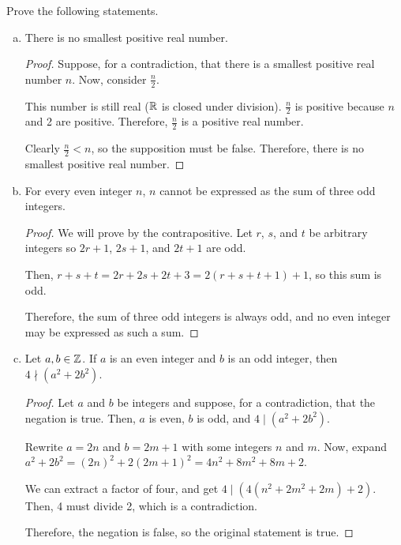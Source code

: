 \question Prove the following statements.
\begin{enumerate}[(a)]
  \item There is no smallest positive real number.
        \begin{proof}
          Suppose, for a contradiction, that there is a smallest positive real number $n$.
          Now, consider $\frac{n}{2}$.

          This number is still real ($\mathbb{R}$ is closed under division).
          $\frac{n}{2}$ is positive because $n$ and 2 are positive.
          Therefore, $\frac{n}{2}$ is a positive real number.

          Clearly $\frac{n}{2} < n$, so the supposition must be false.
          Therefore, there is no smallest positive real number.
        \end{proof}

  \item For every even integer $n$, $n$ cannot be expressed as the sum of three odd integers.
        \begin{proof}
          We will prove by the contrapositive.
          Let $r$, $s$, and $t$ be arbitrary integers so $2r+1$, $2s+1$, and $2t+1$ are odd.

          Then, $r + s + t = 2r + 2s + 2t + 3 = 2(r + s + t + 1) + 1$, so this sum is odd.

          Therefore, the sum of three odd integers is always odd, and no even integer may be expressed as such a sum.
        \end{proof}

  \item Let $a,b\in\mathbb{Z}$.
        If $a$ is an even integer and $b$ is an odd integer, then $4 \nmid (a^2 + 2b^2)$.
        \begin{proof}
          Let $a$ and $b$ be integers and suppose, for a contradiction, that the negation is true.
          Then, $a$ is even, $b$ is odd, and $4 \mid (a^2 + 2b^2)$.

          Rewrite $a=2n$ and $b=2m+1$ with some integers $n$ and $m$.
          Now, expand $a^2 + 2b^2 = (2n)^2 + 2(2m+1)^2 = 4n^2 + 8m^2 + 8m + 2$.

          We can extract a factor of four, and get $4 \mid (4(n^2 + 2m^2 + 2m) + 2)$.
          Then, 4 must divide 2, which is a contradiction.

          Therefore, the negation is false, so the original statement is true.
        \end{proof}


\end{enumerate}
